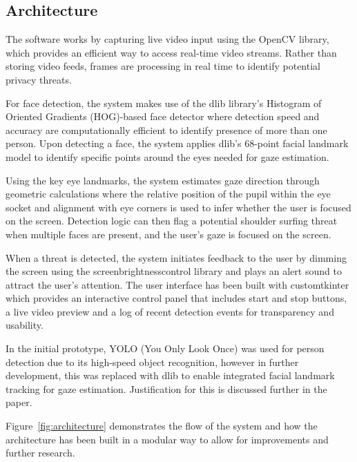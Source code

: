 \documentclass[12pt]{article}
\theoremstyle{plain}
\theoremstyle{definition}
\begin{document}
\subsection{Architecture}
\label{Architecture}
The software works by capturing live video input using the OpenCV library, which provides an efficient way to access real-time video streams. Rather than storing video feeds, frames are processing in real time to identify potential privacy threats.

For face detection, the system makes use of the dlib library’s Histogram of Oriented Gradients (HOG)-based face detector where detection speed and accuracy are computationally efficient to identify presence of more than one person. Upon detecting a face, the system applies dlib’s 68-point facial landmark model to identify specific points around the eyes needed for gaze estimation. 

Using the key eye landmarks, the system estimates gaze direction through geometric calculations where the relative position of the pupil within the eye socket and alignment with eye corners is used to infer whether the user is focused on the screen. Detection logic can then flag a potential shoulder surfing threat when multiple faces are present, and the user’s gaze is focused on the screen.

When a threat is detected, the system initiates feedback to the user by dimming the screen using the screen\textunderscore brightness\textunderscore control library and plays an alert sound to attract the user’s attention. The user interface has been built with customtkinter which provides an interactive control panel that includes start and stop buttons, a live video preview and a log of recent detection events for transparency and usability. 

In the initial prototype, YOLO (You Only Look Once) was used for person detection due to its high-speed object recognition, however in further development, this was replaced with dlib to enable integrated facial landmark tracking for gaze estimation. Justification for this is discussed further in the paper.

Figure~\ref{fig:architecture} demonstrates the flow of the system and how the architecture has been built in a modular way to allow for improvements and further research.
\end{document}
